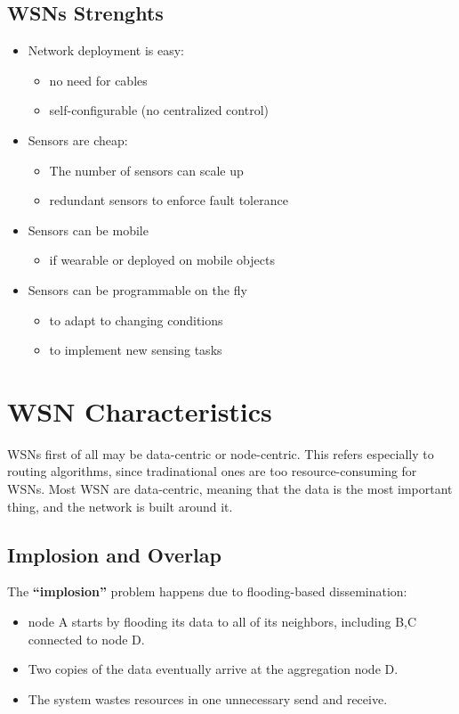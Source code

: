 \subsection{WSNs Strenghts}
\begin{itemize}
   \item Network deployment is easy:
   \begin{itemize}
      \item no need for cables
      \item self-configurable (no centralized control)
   \end{itemize}
   \item Sensors are cheap:
   \begin{itemize}
      \item The number of sensors can scale up
      \item redundant sensors to enforce fault tolerance
   \end{itemize}
   \item Sensors can be mobile
   \begin{itemize}
      \item if wearable or deployed on mobile objects
   \end{itemize}
   \item Sensors can be programmable on the fly
   \begin{itemize}
      \item to adapt to changing conditions
      \item to implement new sensing tasks
   \end{itemize}
\end{itemize}

\section{WSN Characteristics}
WSNs first of all may be data-centric or node-centric. This refers especially to routing algorithms, since tradinational ones are too resource-consuming for WSNs.
Most WSN are data-centric, meaning that the data is the most important thing, and the network is built around it.

\subsection{Implosion and Overlap}
The \textbf{``implosion''} problem happens due to flooding-based dissemination:
\begin{itemize}
   \item node A starts by flooding its data to all of its neighbors, including B,C connected to node D.
   \item Two copies of the data eventually arrive at
   the aggregation node D.
   \item The system wastes resources in one
   unnecessary send and receive.
\end{itemize}

